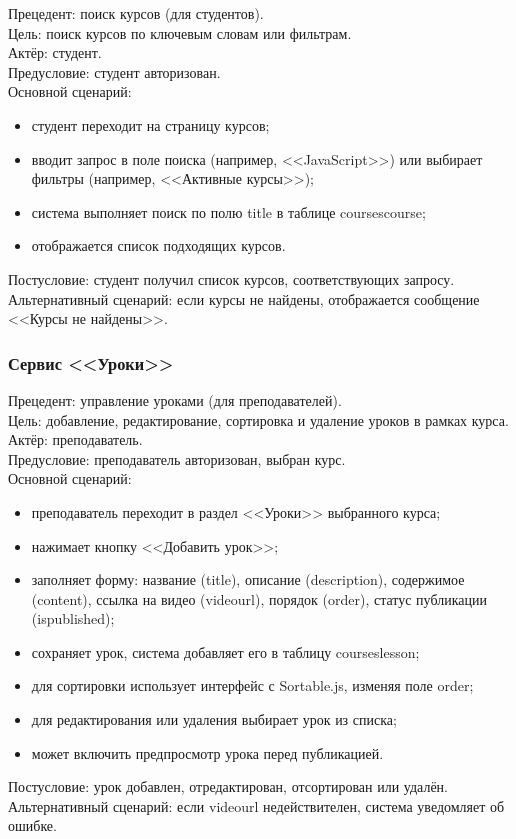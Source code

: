 {Прецедент: поиск курсов (для студентов)}. \\
{Цель}: поиск курсов по ключевым словам или фильтрам. \\
{Актёр}: студент. \\
{Предусловие}: студент авторизован. \\
{Основной сценарий}:
\begin{itemize}
	\item студент переходит на страницу курсов;
	\item вводит запрос в поле поиска (например, <<JavaScript>>) или выбирает фильтры (например, <<Активные курсы>>);
	\item система выполняет поиск по полю title в таблице coursescourse;
	\item отображается список подходящих курсов.
\end{itemize}
{Постусловие}: студент получил список курсов, соответствующих запросу. \\
{Альтернативный сценарий}: если курсы не найдены, отображается сообщение <<Курсы не найдены>>.

\subsubsection{Сервис <<Уроки>>}

{Прецедент: управление уроками (для преподавателей)}. \\
{Цель}: добавление, редактирование, сортировка и удаление уроков в рамках курса. \\
{Актёр}: преподаватель. \\
{Предусловие}: преподаватель авторизован, выбран курс. \\
{Основной сценарий}:
\begin{itemize}
	\item преподаватель переходит в раздел <<Уроки>> выбранного курса;
	\item нажимает кнопку <<Добавить урок>>;
	\item заполняет форму: название (title), описание (description), содержимое (content), ссылка на видео (videourl), порядок (order), статус публикации (ispublished);
	\item сохраняет урок, система добавляет его в таблицу courseslesson;
	\item для сортировки использует интерфейс с Sortable.js, изменяя поле order;
	\item для редактирования или удаления выбирает урок из списка;
	\item может включить предпросмотр урока перед публикацией.
\end{itemize}
{Постусловие}: урок добавлен, отредактирован, отсортирован или удалён. \\
{Альтернативный сценарий}: если videourl недействителен, система уведомляет об ошибке.

